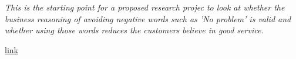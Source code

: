 \textit{This is the starting point for a proposed research projec to look at whether the business reasoning of avoiding negative words such as 'No problem' is valid and whether using those words reduces the customers believe in good service.}

\href{https://www.authorea.com/users/19736/articles/22373/master/file/Unknown.png}{link}
  
  